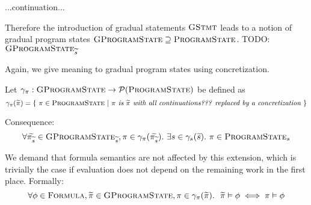 
...continuation...

Therefore the introduction of gradual statements $\textsc{GStmt}$ leads to a notion of gradual program states $\textsc{GProgramState} \supseteq \textsc{ProgramState}$.
TODO: $\textsc{GProgramState}_{\widetilde{s}}$

Again, we give meaning to gradual program states using concretization.
\begin{definition}
    Let $\gamma_{\pi} : \textsc{GProgramState} \rightarrow \mathcal{P}(\textsc{ProgramState})$ be defined as
    \begin{displaymath}
    \gamma_{\pi}(\widetilde{\pi}) = \{~ \pi \in \textsc{ProgramState} ~|~ \textit{$\pi$ is $\widetilde{\pi}$ with all continuations??? replaced by a concretization} ~\}
    \end{displaymath}
\end{definition}

Consequence:
\begin{displaymath}
\forall \widetilde{\pi_{\widetilde{s}}} \in \textsc{GProgramState}_{\widetilde{s}}, \pi \in \gamma_{\pi}(\widetilde{\pi_{\widetilde{s}}}).~ \exists s \in \gamma_s(\widetilde{s}).~ \pi \in \textsc{ProgramState}_s
\end{displaymath}

We demand that formula semantics are not affected by this extension, which is trivially the case if evaluation does not depend on the remaining work in the first place.
Formally: $$\forall \phi \in \textsc{Formula}, \widetilde{\pi} \in \textsc{GProgramState}, \pi \in \gamma_{\pi}(\widetilde{\pi}).~~ \widetilde{\pi} \vDash \phi \iff \pi \vDash \phi$$
